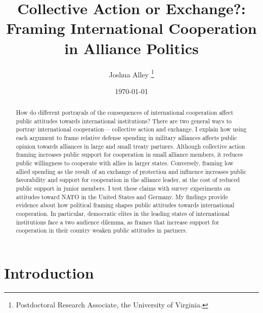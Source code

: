 \documentclass[12pt]{article}
\title{\textbf{Collective Action or Exchange?: Framing International Cooperation in Alliance Politics}}
\author{Joshua Alley
\footnote{Postdoctoral Research Associate, the University of Virginia.}
}
\date{\today}
\begin{document}
\maketitle 

\doublespace 

\begin{abstract}
How do different portrayals of the consequences of international cooperation affect public attitudes towards international institutions? 
There are two general ways to portray international cooperation--- collective action and exchange. 
I explain how using each argument to frame relative defense spending in military alliances affects public opinion towards alliances in large and small treaty partners. 
Although collective action framing increases public support for cooperation in small alliance members, it reduces public willingness to cooperate with allies in larger states. 
Conversely, framing low allied spending as the result of an exchange of protection and influence increases public favorability and support for cooperation in the alliance leader, at the cost of reduced public support in junior members. 
I test these claims with survey experiments on attitudes toward NATO in the United States and Germany. 
My findings provide evidence about how political framing shapes public attitudes towards international cooperation. 
In particular, democratic elites in the leading states of international institutions face a two audience dilemma, as frames  that increase support for cooperation in their country weaken public attitudes in partners. 
\end{abstract}




\newpage 


\section{Introduction}
\end{document}
